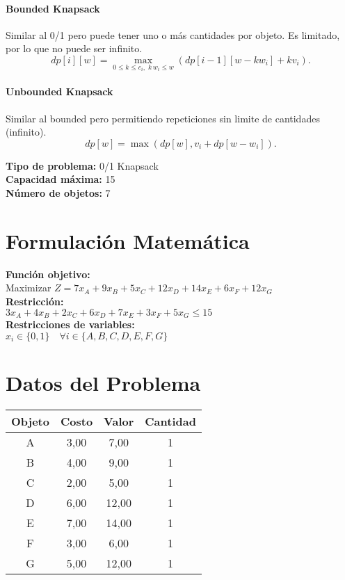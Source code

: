 \documentclass{article}
\begin{document}
\paragraph{Bounded Knapsack} Similar al 0/1 pero puede tener uno o más cantidades por objeto. Es limitado, por lo que no puede ser infinito. 
\[
dp[i][w] = 
\max_{0 \leq k \leq c_i,\; k\,w_i \leq w} \left( dp[i-1][w - k w_i] + k v_i \right).
\]

\paragraph{Unbounded Knapsack} Similar al bounded pero permitiendo repeticiones sin limite de cantidades (infinito).
\[
dp[w] = \max ( dp[w], v_i + dp[w - w_i] ).
\]

\thispagestyle{empty}
\newpage
\textbf{Tipo de problema:} 0/1 Knapsack\\
\textbf{Capacidad máxima:} 15\\
\textbf{Número de objetos:} 7\\

\section*{Formulación Matemática}
\textbf{Función objetivo:}\\
Maximizar $Z = 7 x_{A} + 9 x_{B} + 5 x_{C} + 12 x_{D} + 14 x_{E} + 6 x_{F} + 12 x_{G}$\\

\textbf{Restricción:}\\
$3 x_{A} + 4 x_{B} + 2 x_{C} + 6 x_{D} + 7 x_{E} + 3 x_{F} + 5 x_{G} \leq 15$\\

\textbf{Restricciones de variables:}\\
$x_i \in \{0, 1\} \quad \forall i \in \{A, B, C, D, E, F, G\}$\\
\vspace{0.5cm}

\section*{Datos del Problema}
\begin{tabular}{|c|c|c|c|}
\hline
Objeto & Costo & Valor & Cantidad \\
\hline
A & 3,00 & 7,00 & 1 \\
B & 4,00 & 9,00 & 1 \\
C & 2,00 & 5,00 & 1 \\
D & 6,00 & 12,00 & 1 \\
E & 7,00 & 14,00 & 1 \\
F & 3,00 & 6,00 & 1 \\
G & 5,00 & 12,00 & 1 \\
\hline
\end{tabular}
\end{document}
